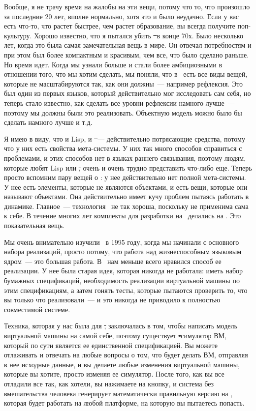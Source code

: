 Вообще, я не трачу время на жалобы на эти вещи, потому что то, что произошло за 
последние 20 лет, вполне нормально, хотя это и было неудачно.
Если у вас есть что-то, что растет быстрее, чем растет образование, вы всегда получите поп-культуру.
Хорошо известно, что я пытался убить \st\ в конце 70х.
Было несколько лет, когда это была самая замечательная вещь в мире.
Он отвечал потребностям и при этом был более компактным и красивым, чем все, что было сделано раньше.
Но время идет.
Когда мы узнали больше и стали более амбициозными в отношении того, что мы хотим сделать, 
мы поняли, что в \st\ есть все виды вещей, которые не масштабируются так, как они должны\ --- например
рефлексия. Это был один из первых языков, который действительно мог исследовать сам себя, 
но теперь стало известно, как сделать все уровни рефлексии намного лучше\ --- поэтому мы должны были это реализовать.
Объектную модель можно было бы сделать намного лучше и т.д.

Я имею в виду, что и Lisp, и \st\ --- действительно потрясающие средства, потому что у них есть свойства мета-системы.
У них так много способов справиться с проблемами, и этих способов нет в языках раннего связывания, 
поэтому людям, которые любят Lisp или \st, очень и очень трудно представить что-либо еще.
Теперь просто вспомним пару вещей о \java: у нее действительно нет полной мета-системы.
У нее есть элементы, которые не являются объектами, и есть вещи, которые они называют объектами.
Она действительно имеет кучу проблем пытаясь работать в динамике.
Главное\ --- технология \java\ не так хороша, поскольку не применима сама к себе.
В течение многих лет комплекты для разработки на \java\ делались на \cpp. Это показательная вещь.

Мы очень внимательно изучили \java\ в 1995 году, когда мы начинали с основного набора реализаций,
просто потому, что работа над жизнеспособным языковым ядром\ --- это большая работа.
В \java\ нам меньше всего нравился способ ее реализации.
У нее была старая идея, которая никогда не работала: иметь набор бумажных спецификаций, 
необходимость реализации виртуальной машины по этим спецификациям, а затем гонять тесты, 
которые пытаются проверить то, что вы только что реализовали\ --- и это никогда не приводило 
к полностью совместимой системе.

Техника, которая у нас была для \st, заключалась в том, чтобы написать модель виртуальной машины
на самой себе, поэтому существует \st-симулятор ВМ, который по сути является ее единственной спецификацией.
Вы можете отлаживать и отвечать на любые вопросы о том, что будет делать ВМ, 
отправляя в нее исходные данные, и вы делаете любые изменения виртуальной машины, которые вы хотите,
просто изменяя ее симулятор.
После того, как вы все отладили все так, как хотели, вы нажимаете на кнопку, 
и система без вмешательства человека генерирует математически правильную версию на \ci, 
которая будет работать на любой платформе, на которую вы пытаетесь попасть.

